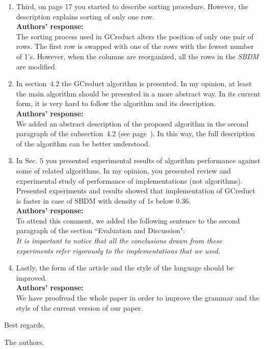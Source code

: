 \documentclass{letter}
\begin{document}
\begin{letter}{}
\begin{enumerate}
	\item Third, on page 17 you started to describe sorting procedure. However, the description explains sorting of only one row.\\
	\textbf{Authors’ response:}\\
	The sorting process used in GCreduct alters the position of only one pair of rows. The first row is swapped with one of the rows with the fewest number of 1's. However, when the columns are reorganized, all the rows in the \textit{SBDM} are modified.
	
	\item In section~4.2 the GCreduct algorithm is presented. In my opinion, at least the main algorithm should be presented in a more abstract way. In its current form, it is very hard to follow the algorithm and its description.\\
	\textbf{Authors’ response:}\\
	We added an abstract description of the proposed algorithm in the second paragraph of the subsection~4.2 (see page~\pageref{abstarct}). In this way, the full description of the algorithm can be better understood.

	\item In Sec. 5 you presented experimental results of algorithm performance against some of related algorithms. In my opinion, you presented review and experimental  study of performance of implementations (not algorithms). Presented experiments and results showed that implementation of GCreduct is faster in case of SBDM with density of 1s below 0.36.\\
	\textbf{Authors’ response:}\\
	To attend this comment, we added the following sentence to the second paragraph of the section ``Evaluation and Discussion":\\
	\textit{It is important to notice that all the conclusions drawn from these experiments refer rigorously to the implementations that we used.}
	
	\item Lastly, the form of the article and the style of the language should be improved.\\
	\textbf{Authors’ response:}\\
	We have proofread the whole paper in order to improve the grammar and the style of the current version of our paper.
	
	
  \end{enumerate}     
  
  Best regards,

  The authors.
  
\end{letter}
\end{document}
